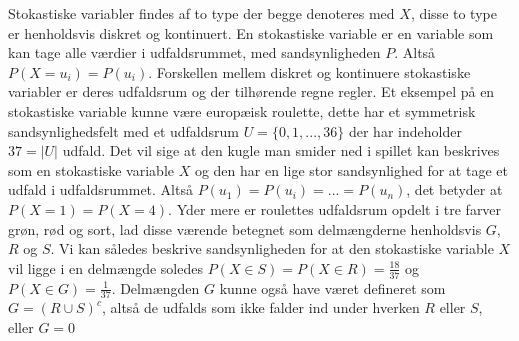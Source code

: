 \documentclass[../../SRP.tex]{subfiles}
\begin{document}
Stokastiske variabler findes af to type der begge denoteres med $X$, disse to type er henholdsvis diskret og kontinuert. En stokastiske variable er en variable som kan tage alle værdier i udfaldsrummet, med sandsynligheden $P$. Altså $P(X = u_i) = P(u_i)$. Forskellen mellem diskret og kontinuere stokastiske variabler er deres udfaldsrum og der tilhørende regne regler. Et eksempel på en stokastiske variable kunne være europæisk roulette, dette har et symmetrisk sandsynlighedsfelt med et udfaldsrum $U = \{ 0,1,...,36\}$ der har indeholder $37 = |U|$ udfald. Det vil sige at den kugle man smider ned i spillet kan beskrives som en stokastiske variable $X$ og den har en lige stor sandsynlighed for at tage et udfald i udfaldsrummet. Altså $P(u_1) = P(u_i) = ... = P(u_n)$, det betyder at $P(X = 1) = P(X = 4)$. Yder mere er roulettes udfaldsrum opdelt i tre farver grøn, rød og sort, lad disse værende betegnet som delmængderne henholdsvis $G$, $R$ og $S$. Vi kan således beskrive sandsynligheden for at den stokastiske variable $X$ vil ligge i en delmængde soledes $P(X \in S) = P(X \in R) = \frac{18}{37}$ og $P(X \in G) = \frac{1}{37}$. Delmængden $G$ kunne også have været defineret som $G = (R \cup S)^c$, altså de udfalds som ikke falder ind under hverken $R$ eller $S$, eller $G = 0$ \\
\end{document}
